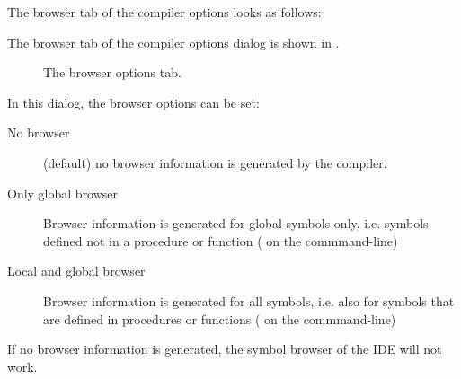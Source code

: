 \begin{htmlonly}
The browser tab of the compiler options looks as follows:
\end{htmlonly}
\begin{latexonly}
The browser tab of the compiler options dialog is shown in
.
\begin{figure}[ht]
\begin{center}
\caption{The browser options tab.}\label{fig:ocompd}
\ifpdf
{}
\else
{}
\fi
\end{center}
\end{figure}
\end{latexonly}
In this dialog, the browser options can be set:
\begin{description}
\item[No browser] (default) no browser information is generated by the
compiler.
\item[Only global browser] Browser information is generated for global
symbols only, i.e. symbols defined not in a procedure or function ( on the commmand-line)
\item[Local and global browser]  Browser information is generated for all 
symbols, i.e. also for symbols that are defined in procedures or functions 
 ( on the commmand-line)
\end{description}
\begin{remark}
If no browser information is generated, the symbol browser of the IDE will
not work.
\end{remark}

